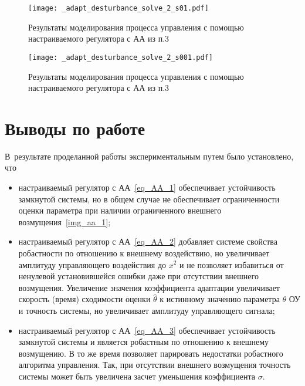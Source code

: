 \begin{figure}[h!]
	\centering
	\texttt{[image: \_adapt\_desturbance\_solve\_2\_s01.pdf]}
	\caption{Результаты моделирования процесса управления с помощью настраиваемого регулятора с АА из п.3}
	\label{img_aa_3_s0.1}
\end{figure}

\begin{figure}[h!]
	\centering
	\texttt{[image: \_adapt\_desturbance\_solve\_2\_s001.pdf]}
	\caption{Результаты моделирования процесса управления с помощью настраиваемого регулятора с АА из п.3}
	\label{img_aa_3_s0.01}
\end{figure}


\newpage
\mbox{}
\newpage

\clearpage
\section{Выводы по работе}
В~результате проделанной работы экспериментальным путем было установлено, что
\begin{itemize}
	\item настраиваемый регулятор с АА~\eqref{eq_AA_1} обеспечивает устойчивость замкнутой системы, но в общем случае не обеспечивает ограниченности оценки параметра при наличии ограниченного внешнего возмущения~\ref{img_aa_1};
	\item настраиваемый регулятор с АА~\eqref{eq_AA_2} добавляет системе свойства робастности по отношению к внешнему воздействию, но увеличивает амплитуду управляющего воздействия до $x^2$ и не позволяет избавиться от ненулевой установившейся ошибки даже при отсутствии внешнего возмущения. Увеличение значения коэффициента адаптации увеличивает скорость (время) сходимости оценки $\hat{\theta}$ к истинному значению параметра $\theta$ ОУ и точность системы, но увеличивает амплитуду управляющего сигнала;
	\item настраиваемый регулятор с АА~\eqref{eq_AA_3} обеспечивает устойчивость замкнутой системы и является робастным по отношению к внешнему возмущению. В то же время позволяет парировать недостатки робастного алгоритма управления. Так, при отсутствии внешнего возмущения точность системы может быть увеличена засчет уменьшения коэффициента $\sigma$.
\end{itemize}